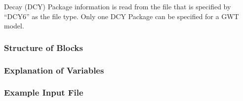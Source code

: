 Decay (DCY) Package information is read from the file that is specified by ``DCY6'' as the file type.  Only one DCY Package can be specified for a GWT model. 

\vspace{5mm}
\subsubsection{Structure of Blocks}



\vspace{5mm}
\subsubsection{Explanation of Variables}
\begin{description}

\end{description}

\vspace{5mm}
\subsubsection{Example Input File}


